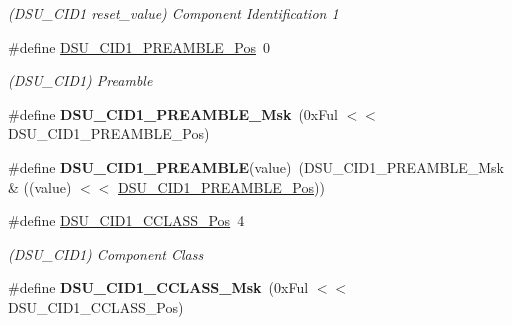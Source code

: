 \begin{DoxyCompactItemize}
\begin{DoxyCompactList}\small\item\em (D\+S\+U\+\_\+\+C\+I\+D1 reset\+\_\+value) Component Identification 1 \end{DoxyCompactList}\item 
\hypertarget{group___s_a_m_l21___d_s_u_ga7496e12eabba3a78eaef45bd496a9c89}{}\#define \hyperlink{group___s_a_m_l21___d_s_u_ga7496e12eabba3a78eaef45bd496a9c89}{D\+S\+U\+\_\+\+C\+I\+D1\+\_\+\+P\+R\+E\+A\+M\+B\+L\+E\+\_\+\+Pos}~0\label{group___s_a_m_l21___d_s_u_ga7496e12eabba3a78eaef45bd496a9c89}

\begin{DoxyCompactList}\small\item\em (D\+S\+U\+\_\+\+C\+I\+D1) Preamble \end{DoxyCompactList}\item 
\hypertarget{group___s_a_m_l21___d_s_u_ga10a983b3963ff405e03427c16369b0be}{}\#define {\bfseries D\+S\+U\+\_\+\+C\+I\+D1\+\_\+\+P\+R\+E\+A\+M\+B\+L\+E\+\_\+\+Msk}~(0x\+Ful $<$$<$ D\+S\+U\+\_\+\+C\+I\+D1\+\_\+\+P\+R\+E\+A\+M\+B\+L\+E\+\_\+\+Pos)\label{group___s_a_m_l21___d_s_u_ga10a983b3963ff405e03427c16369b0be}

\item 
\hypertarget{group___s_a_m_l21___d_s_u_gac5f44f703f59fd2e482381626a483701}{}\#define {\bfseries D\+S\+U\+\_\+\+C\+I\+D1\+\_\+\+P\+R\+E\+A\+M\+B\+L\+E}(value)~(D\+S\+U\+\_\+\+C\+I\+D1\+\_\+\+P\+R\+E\+A\+M\+B\+L\+E\+\_\+\+Msk \& ((value) $<$$<$ \hyperlink{group___s_a_m_l21___d_s_u_ga7496e12eabba3a78eaef45bd496a9c89}{D\+S\+U\+\_\+\+C\+I\+D1\+\_\+\+P\+R\+E\+A\+M\+B\+L\+E\+\_\+\+Pos}))\label{group___s_a_m_l21___d_s_u_gac5f44f703f59fd2e482381626a483701}

\item 
\hypertarget{group___s_a_m_l21___d_s_u_gaa505d5dbcb38fd84adf608eaaa7948a6}{}\#define \hyperlink{group___s_a_m_l21___d_s_u_gaa505d5dbcb38fd84adf608eaaa7948a6}{D\+S\+U\+\_\+\+C\+I\+D1\+\_\+\+C\+C\+L\+A\+S\+S\+\_\+\+Pos}~4\label{group___s_a_m_l21___d_s_u_gaa505d5dbcb38fd84adf608eaaa7948a6}

\begin{DoxyCompactList}\small\item\em (D\+S\+U\+\_\+\+C\+I\+D1) Component Class \end{DoxyCompactList}\item 
\hypertarget{group___s_a_m_l21___d_s_u_ga4266168966ac857f7f418fa53692dc42}{}\#define {\bfseries D\+S\+U\+\_\+\+C\+I\+D1\+\_\+\+C\+C\+L\+A\+S\+S\+\_\+\+Msk}~(0x\+Ful $<$$<$ D\+S\+U\+\_\+\+C\+I\+D1\+\_\+\+C\+C\+L\+A\+S\+S\+\_\+\+Pos)\label{group___s_a_m_l21___d_s_u_ga4266168966ac857f7f418fa53692dc42}


\end{DoxyCompactItemize}
